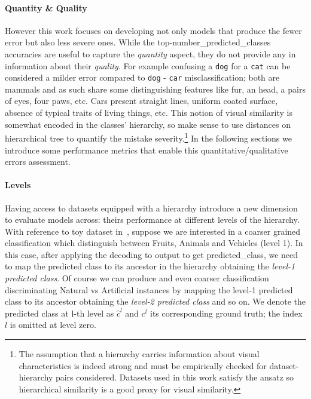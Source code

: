 \paragraph {Quantity \& Quality}
\label{par:metrics-quantity-quality}
However this work focuses on developing not only models that produce the fewer error but also less severe ones. While the top-\gls{number_predicted_classes} accuracies are useful to capture the \emph{quantity} aspect, they do not provide any in information about their \emph{quality}.
For example confusing a \texttt{dog} for a \texttt{cat} can be considered a milder error compared to \texttt{dog} - \texttt{car} misclassification; both are mammals and as such share some distinguishing features like fur, an head, a pairs of eyes, four paws, etc. Cars present straight lines, uniform coated surface, absence of typical traits of living things, etc.
This notion of visual similarity is somewhat encoded in the classes' hierarchy, so make sense to use distances on hierarchical tree to quantify the mistake severity.\footnote{The assumption that a hierarchy carries information about visual characteristics is indeed strong and must be empirically checked for dataset-hierarchy pairs considered.
Datasets used in this work satisfy the ansatz so hierarchical similarity is a good proxy for visual similarity.} In the following sections we introduce some performance metrics that enable this quantitative/qualitative errors assessment.

\paragraph {Levels}
\label{par:metrics-levels}
Having access to datasets equipped with a hierarchy introduce a new dimension to evaluate models across: theirs performance at different levels of the hierarchy.
With reference to toy dataset in~, suppose we are interested in a coarser grained classification which distinguish between Fruits, Animals and Vehicles (level 1). In this case, after applying the decoding to \gls{output} to get \gls{predicted_class}, we need to map the predicted class to its ancestor in the hierarchy obtaining the \emph{level-1 predicted class}. Of course we can produce and even coarser classification discriminating Natural vs Artificial instances by mapping the level-1 predicted class to its ancestor obtaining the \emph{level-2 predicted class} and so on.
We denote the predicted class at l-th level as $\hat{c}^l$ and $c^l$ its corresponding ground truth; the index $l$ is omitted at level zero.

